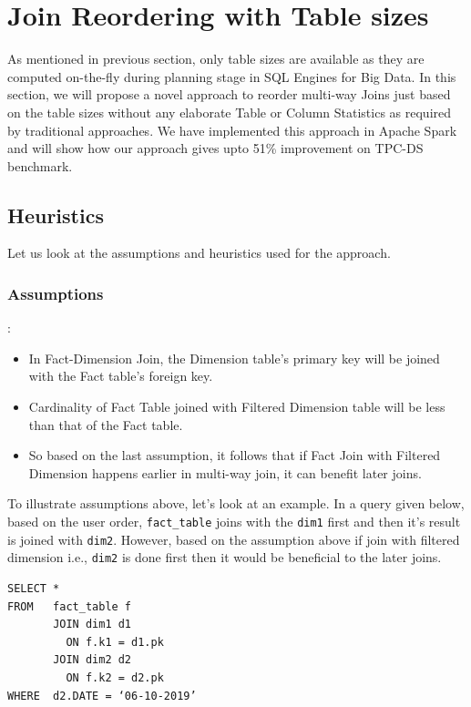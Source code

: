 \section{Join Reordering with Table sizes}\label{sec:jo}
As mentioned in previous section, only table sizes are available as they are computed on-the-fly during planning stage in SQL Engines for Big Data. In this section, we will propose a novel approach to reorder multi-way Joins just based on the table sizes without any elaborate Table or Column Statistics as required by traditional approaches. We have implemented this approach in Apache Spark and will show how our approach gives upto 51\% improvement on TPC-DS benchmark.

\subsection{Heuristics}

Let us look at the assumptions and heuristics used for the approach.

\subsubsection{Assumptions}\label{subsubsec:assumption}:

\begin{itemize}
\item In Fact-Dimension Join, the Dimension table’s primary key will be joined with the Fact table’s foreign key.
\item Cardinality of Fact Table joined with Filtered Dimension table will be less than that of the Fact table.
\item So based on the last assumption, it follows that if Fact Join with Filtered Dimension happens earlier in multi-way join, it can benefit later joins.
\end{itemize}

To illustrate assumptions above, let's look at an example. In a query given below, based on the user order,  \texttt{fact\_table} joins with the \texttt{dim1} first and then it's result is joined with \texttt{dim2}. However, based on the assumption above if join with filtered dimension i.e., \texttt{dim2} is done first then it would be beneficial to the later joins.

\begin{verbatim}
SELECT * 
FROM   fact_table f 
       JOIN dim1 d1 
         ON f.k1 = d1.pk 
       JOIN dim2 d2 
         ON f.k2 = d2.pk 
WHERE  d2.DATE = ‘06-10-2019’ 
\end{verbatim}

